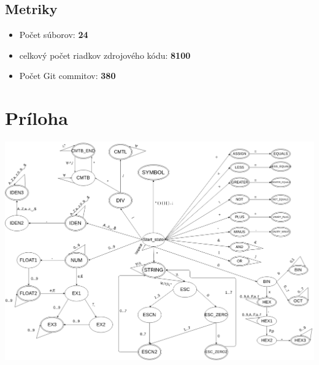 \documentclass[12pt,a4paper]{report}
\begin{document}
\section{Metriky}

\begin{itemize}
\item Počet súborov: \textbf{24}
\item celkový počet riadkov zdrojového kódu: \textbf{8100}
\item Počet Git commitov: \textbf{380}
\end{itemize}


\chapter{Príloha}
\includegraphics[width=1\textwidth]{./img/lex1.pdf}\\
\end{document}
